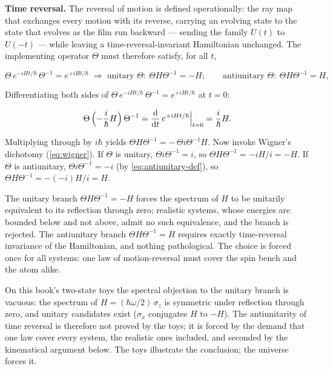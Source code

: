 \medskip\noindent\textbf{Time reversal.} The reversal of motion is defined operationally: the ray map that exchanges every motion with its reverse, carrying an evolving state to the state that evolves as the film run backward --- sending the family $U(t)$ to $U(-t)$ --- while leaving a time-reversal-invariant Hamiltonian unchanged. The implementing operator $\Theta$ must therefore satisfy, for all $t$,
\begin{linenomath}
    \begin{equation}
        \Theta\,e^{-iHt/\hbar}\,\Theta^{-1} = e^{+iHt/\hbar}
        \;\Longrightarrow\;
        \text{unitary } \Theta:\ \Theta H \Theta^{-1} = -H ;
        \qquad
        \text{antiunitary } \Theta:\ \Theta H \Theta^{-1} = H ,
        \label{eq:time-reversal-def}
    \end{equation}
\end{linenomath}
Differentiating both sides of $\Theta\,e^{-iHt/\hbar}\,\Theta^{-1} = e^{+iHt/\hbar}$ at $t=0$:
\begin{linenomath}
    \begin{equation*}
        \Theta\,\Bigl(-\frac{i}{\hbar}H\Bigr)\,\Theta^{-1}
        = \Bigl.\frac{\mathrm{d}}{\mathrm{d} t}\,e^{+iHt/\hbar}\Bigr|_{t=0}
        = \frac{i}{\hbar}H .
    \end{equation*}
\end{linenomath}
Multiplying through by $i\hbar$ yields $\Theta H \Theta^{-1} = -\,\Theta i \Theta^{-1} H$. Now invoke Wigner's dichotomy (\eqref{eq:wigner}). If $\Theta$ is unitary, $\Theta i \Theta^{-1} = i$, so $\Theta H \Theta^{-1} = -iH/i = -H$. If $\Theta$ is antiunitary, $\Theta i \Theta^{-1} = -i$ (by \eqref{eq:antiunitary-def}), so $\Theta H \Theta^{-1} = -(-i)H/i = H$.

The unitary branch $\Theta H \Theta^{-1} = -H$ forces the spectrum of $H$ to be unitarily equivalent to its reflection through zero; realistic systems, whose energies are bounded below and not above, admit no such equivalence, and the branch is rejected. The antiunitary branch $\Theta H \Theta^{-1} = H$ requires exactly time-reversal invariance of the Hamiltonian, and nothing pathological. The choice is forced once for all systems: one law of motion-reversal must cover the spin bench and the atom alike.

\begin{note}
    On this book's two-state toys the spectral objection to the unitary branch is vacuous: the spectrum of $H = (\hbar\omega/2)\,\sigma_z$ is symmetric under reflection through zero, and unitary candidates exist ($\sigma_x$ conjugates $H$ to $-H$). The antiunitarity of time reversal is therefore not proved by the toys; it is forced by the demand that one law cover every system, the realistic ones included, and seconded by the kinematical argument below. The toys illustrate the conclusion; the universe forces it.
\end{note}

